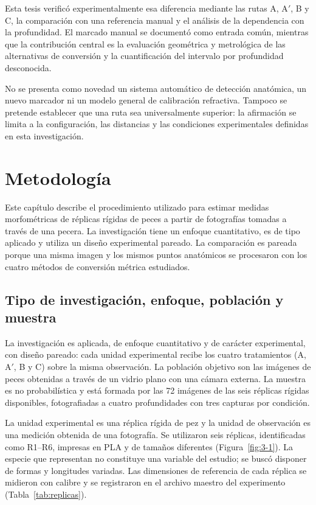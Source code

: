 \documentclass{report}
\newcommand{\Aprime}{A$'$}
\begin{document}
Esta tesis verificó experimentalmente esa diferencia mediante las rutas A, \Aprime, B y C, la comparación con una referencia manual y el análisis de la dependencia con la profundidad. El marcado manual se documentó como entrada común, mientras que la contribución central es la evaluación geométrica y metrológica de las alternativas de conversión y la cuantificación del intervalo por profundidad desconocida.

No se presenta como novedad un sistema automático de detección anatómica, un nuevo marcador ni un modelo general de calibración refractiva. Tampoco se pretende establecer que una ruta sea universalmente superior: la afirmación se limita a la configuración, las distancias y las condiciones experimentales definidas en esta investigación.

\chapter{Metodología}
\label{cap:metodologia}

Este capítulo describe el procedimiento utilizado para estimar medidas morfométricas de réplicas rígidas de peces a partir de fotografías tomadas a través de una pecera. La investigación tiene un enfoque cuantitativo, es de tipo aplicado y utiliza un diseño experimental pareado. La comparación es pareada porque una misma imagen y los mismos puntos anatómicos se procesaron con los cuatro métodos de conversión métrica estudiados.

\section{Tipo de investigación, enfoque, población y muestra}
\label{sec:diseno}

La investigación es aplicada, de enfoque cuantitativo y de carácter experimental, con diseño pareado: cada unidad experimental recibe los cuatro tratamientos (A, \Aprime, B y C) sobre la misma observación. La población objetivo son las imágenes de peces obtenidas a través de un vidrio plano con una cámara externa. La muestra es no probabilística y está formada por las 72 imágenes de las seis réplicas rígidas disponibles, fotografiadas a cuatro profundidades con tres capturas por condición.

La unidad experimental es una réplica rígida de pez y la unidad de observación es una medición obtenida de una fotografía. Se utilizaron seis réplicas, identificadas como R1--R6, impresas en PLA y de tamaños diferentes (Figura~\ref{fig:3-1}). La especie que representan no constituye una variable del estudio; se buscó disponer de formas y longitudes variadas. Las dimensiones de referencia de cada réplica se midieron con calibre y se registraron en el archivo maestro del experimento (Tabla~\ref{tab:replicas}).
\end{document}

